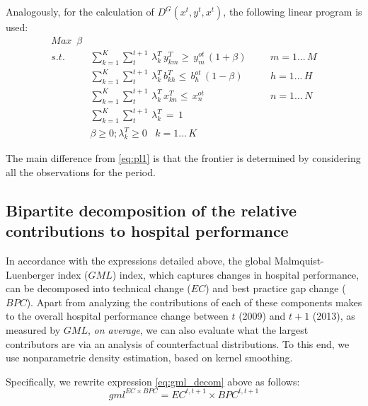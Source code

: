 \documentclass[11pt,a4paper,oneside]{article}
\begin{document}
Analogously, for the calculation of $D^{G}\left( x^{t},y^{t},x^{t}\right) $, the following linear program is used:
%
\begin{equation}
\label{eq:pl2}
\begin{array}{lllll}
Max \,\,\, \beta \\
s.t. & \sum_{k=1}^{K}\sum_{t}^{t+1} \, \lambda_{k}^{T} \, y_{km}^{T}\geq\,y_{m}^{ot} \, \left(1+\beta\right) & & & m=1...\,M\\
& \sum_{k=1}^{K}\sum_{t}^{t+1} \, \lambda_{k}^{T} \, b_{kh}^{T}\leq \, b_{h}^{ot} \, \left(1-\beta\right) & & & h=1...\,H\\
& \sum_{k=1}^{K}\sum_{t}^{t+1} \, \lambda_{k}^{T} \, x_{kn}^{T}\leq \, x_{n}^{ot}  & & & n=1...\,N\\
& \sum_{k=1}^{K}\sum_{t}^{t+1} \, \lambda_{k}^{T} \, =\, 1 \\
&\beta\geq 0 ;\lambda_{k}^{T}\geq 0 \,\,\,\,\, k=1...\,K
\end{array}
\end{equation}

The main difference from \eqref{eq:pl1} is that the frontier is determined by considering all the observations for the period. 


\subsection{Bipartite decomposition of the relative contributions to hospital performance}
\label{sec:bipartite_theory}





In accordance with the expressions detailed above, the global Malmquist-Luenberger index ($GML$) index, which captures changes in hospital performance, can be decomposed into technical change ($EC$) and best practice gap change ($BPC$). Apart from analyzing the contributions of each of these components makes to the overall hospital performance change between $t$ (2009) and $t+1$ (2013), as measured by $GML$, \textsl{on average}, we can also evaluate what the largest contributors are via an analysis of counterfactual distributions. To this end, we use nonparametric density estimation, based on kernel smoothing.


Specifically, we rewrite expression \eqref{eq:gml_decom} above as follows:
%
\begin{equation}
 \label{eq:GML_decomposition_bipartite}
gml^{EC \times BPC} = EC^{t,t+1} \times BPC^{t,t+1}
\end{equation}
\end{document}

